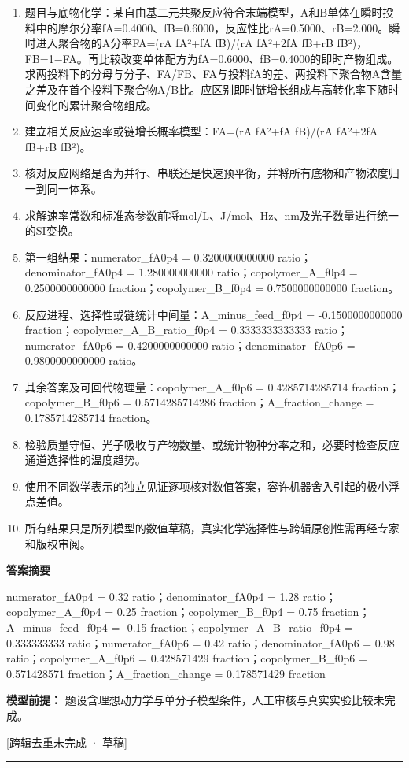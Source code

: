 \documentclass[UTF8,11pt,a4paper]{ctexart}
\begin{document}
\begin{enumerate}
\item 题目与底物化学：某自由基二元共聚反应符合末端模型，A和B单体在瞬时投料中的摩尔分率fA=0.4000、fB=0.6000，反应性比rA=0.5000、rB=2.000。瞬时进入聚合物的A分率FA=(rA fA²+fA fB)/(rA fA²+2fA fB+rB fB²)，FB=1−FA。再比较改变单体配方为fA=0.6000、fB=0.4000的即时产物组成。求两投料下的分母与分子、FA/FB、FA与投料fA的差、两投料下聚合物A含量之差及在首个投料下聚合物A/B比。应区别即时链增长组成与高转化率下随时间变化的累计聚合物组成。
\item 建立相关反应速率或链增长概率模型：FA=(rA fA²+fA fB)/(rA fA²+2fA fB+rB fB²)。
\item 核对反应网络是否为并行、串联还是快速预平衡，并将所有底物和产物浓度归一到同一体系。
\item 求解速率常数和标准态参数前将mol/L、J/mol、Hz、nm及光子数量进行统一的SI变换。
\item 第一组结果：numerator\_fA0p4 = 0.3200000000000 ratio；denominator\_fA0p4 = 1.280000000000 ratio；copolymer\_A\_f0p4 = 0.2500000000000 fraction；copolymer\_B\_f0p4 = 0.7500000000000 fraction。
\item 反应进程、选择性或链统计中间量：A\_minus\_feed\_f0p4 = -0.1500000000000 fraction；copolymer\_A\_B\_ratio\_f0p4 = 0.3333333333333 ratio；numerator\_fA0p6 = 0.4200000000000 ratio；denominator\_fA0p6 = 0.9800000000000 ratio。
\item 其余答案及可回代物理量：copolymer\_A\_f0p6 = 0.4285714285714 fraction；copolymer\_B\_f0p6 = 0.5714285714286 fraction；A\_fraction\_change = 0.1785714285714 fraction。
\item 检验质量守恒、光子吸收与产物数量、或统计物种分率之和，必要时检查反应通道选择性的温度趋势。
\item 使用不同数学表示的独立见证逐项核对数值答案，容许机器舍入引起的极小浮点差值。
\item 所有结果只是所列模型的数值草稿，真实化学选择性与跨辑原创性需再经专家和版权审阅。
\end{enumerate}
\noindent\textbf{答案摘要}\par
numerator\_fA0p4 = 0.32 ratio；denominator\_fA0p4 = 1.28 ratio；copolymer\_A\_f0p4 = 0.25 fraction；copolymer\_B\_f0p4 = 0.75 fraction；A\_minus\_feed\_f0p4 = -0.15 fraction；copolymer\_A\_B\_ratio\_f0p4 = 0.333333333 ratio；numerator\_fA0p6 = 0.42 ratio；denominator\_fA0p6 = 0.98 ratio；copolymer\_A\_f0p6 = 0.428571429 fraction；copolymer\_B\_f0p6 = 0.571428571 fraction；A\_fraction\_change = 0.178571429 fraction\par
\noindent\textbf{模型前提：}
题设含理想动力学与单分子模型条件，人工审核与真实实验比较未完成。\par
\noindent\textcolor{red!65!black}{[跨辑去重未完成 · 草稿]} \par
\medskip\hrule\medskip
{}
\end{document}
